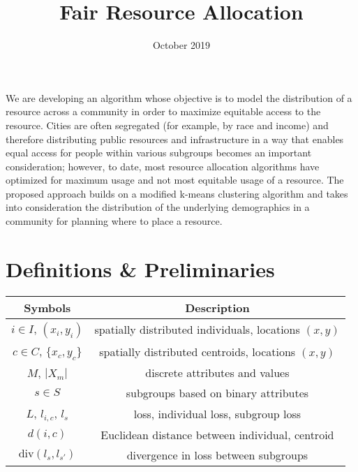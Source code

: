 \documentclass{article}
\title{Fair Resource Allocation}
\author{}
\date{October 2019}
\begin{document}
\maketitle

We are developing an algorithm whose objective is to model the distribution of a resource across a community in order to maximize equitable access to the resource. Cities are often segregated (for example, by race and income) and therefore distributing public resources and infrastructure in a way that enables equal access for people within various subgroups becomes an important consideration; however, to date, most resource allocation algorithms have optimized for maximum usage and not most equitable usage of a resource. The proposed approach builds on a modified k-means clustering algorithm and takes into consideration the distribution of the underlying demographics in a community for planning where to place a resource.

\section{Definitions \& Preliminaries}
\label{sec:defi}

\begin{center}
 \begin{tabular}{||c c||} 
 \hline
 Symbols & Description \\ [0.5ex] 
 \hline\hline
 $i \in I$, $(x_i, y_i)$ & spatially distributed individuals, locations $(x,y)$ \\ 
 $c \in C$, $\{x_c, y_c\}$ & spatially distributed centroids, locations $(x,y)$\\
 $M$, $|X_m|$ & discrete attributes and values\\
 $s \in S$ & subgroups based on binary attributes \\
 $L$, $l_{i,c}$, $l_s$ & loss, individual loss, subgroup loss\\
 $d(i,c)$ & Euclidean distance between individual, centroid \\
 $\mbox{div}(l_s,l_{s'})$ & divergence in loss between subgroups\\
 \hline
\end{tabular}
\end{center}
\end{document}
